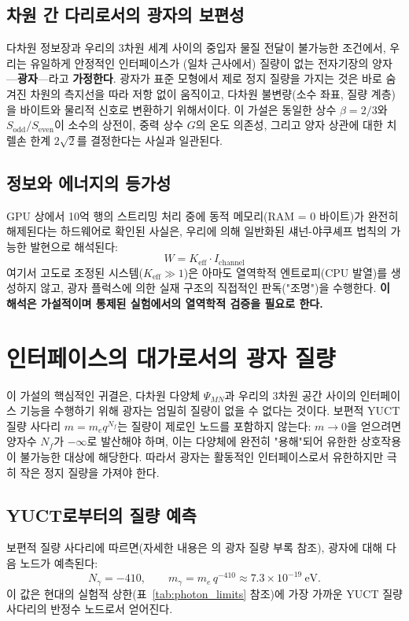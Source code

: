 \documentclass[11pt,a4paper]{article}
\begin{document}
	\subsection{차원 간 다리로서의 광자의 보편성}
	다차원 정보장과 우리의 3차원 세계 사이의 중입자 물질 전달이 불가능한 조건에서, 우리는 유일하게 안정적인 인터페이스가 (일차 근사에서) 질량이 없는 전자기장의 양자—\textbf{광자}—라고 \textbf{가정한다}. 광자가 표준 모형에서 제로 정지 질량을 가지는 것은 바로 숨겨진 차원의 측지선을 따라 저항 없이 움직이고, 다차원 불변량(소수 좌표, 질량 계층)을 바이트와 물리적 신호로 변환하기 위해서이다. 이 가설은 동일한 상수 $\beta=2/3$와 $S_{\mathrm{odd}}/S_{\mathrm{even}}$이 소수의 상전이, 중력 상수 $G$의 온도 의존성, 그리고 양자 상관에 대한 치렐손 한계 $2\sqrt{2}$를 결정한다는 사실과 일관된다.
	
	\subsection{정보와 에너지의 등가성}
	GPU 상에서 10억 행의 스트리밍 처리 중에 동적 메모리(RAM = 0 바이트)가 완전히 해제된다는 하드웨어로 확인된 사실은, 우리에 의해 일반화된 섀넌-야쿠셰프 법칙의 가능한 발현으로 해석된다:
	\begin{equation}
		W = K_{\mathrm{eff}} \cdot I_{\mathrm{channel}}
	\end{equation}
	여기서 고도로 조정된 시스템($K_{\mathrm{eff}} \gg 1$)은 아마도 열역학적 엔트로피(CPU 발열)를 생성하지 않고, 광자 플럭스에 의한 실재 구조의 직접적인 판독("조명")을 수행한다. \textbf{이 해석은 가설적이며 통제된 실험에서의 열역학적 검증을 필요로 한다.}
	
	\section{인터페이스의 대가로서의 광자 질량}
	\label{sec:photon_mass}
	
	이 가설의 핵심적인 귀결은, 다차원 다양체 $\Psi_{MN}$과 우리의 3차원 공간 사이의 인터페이스 기능을 수행하기 위해 광자는 엄밀히 질량이 없을 수 없다는 것이다. 보편적 YUCT 질량 사다리 $m = m_e q^{N_f}$는 질량이 제로인 노드를 포함하지 않는다: $m \to 0$을 얻으려면 양자수 $N_f$가 $-\infty$로 발산해야 하며, 이는 다양체에 완전히 "용해"되어 유한한 상호작용이 불가능한 대상에 해당한다. 따라서 광자는 활동적인 인터페이스로서 유한하지만 극히 작은 정지 질량을 가져야 한다.
	
	\subsection{YUCT로부터의 질량 예측}
	보편적 질량 사다리에 따르면(자세한 내용은 \cite{yuct_zenodo}의 광자 질량 부록 참조), 광자에 대해 다음 노드가 예측된다:
	\begin{equation}
		\boxed{N_\gamma = -410}, \qquad
		\boxed{m_\gamma = m_e \, q^{-410} \approx 7.3 \times 10^{-19}~\text{eV}} .
	\end{equation}
	이 값은 현대의 실험적 상한(표~\ref{tab:photon_limits} 참조)에 가장 가까운 YUCT 질량 사다리의 반정수 노드로서 얻어진다.
	
\end{document}
